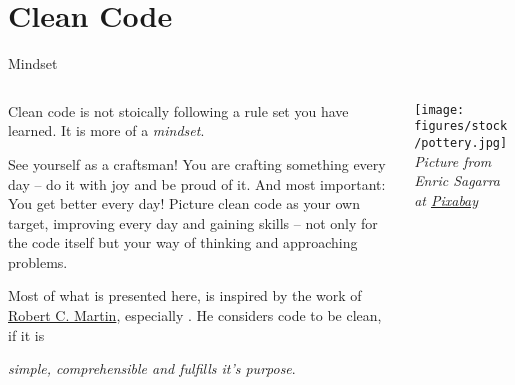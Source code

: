 \documentclass[aspectratio=1610, 9pt]{beamer}
\begin{document}
\section{Clean Code}
\begin{frame}{Mindset}
    \begin{columns}
        \begin{column}{0.5\textwidth}
            \setlength{\parskip}{12pt}%
            Clean code is not stoically following a rule set you have learned.
            It is more of a \textcolor{tugreen}{\emph{mindset}}.

            See yourself as a craftsman!
            You are crafting something every day -- do it with joy and be proud of it.
            And most important: You get better every day!
            Picture clean code as your own target, improving every day and gaining skills -- not only for the code itself but your way of thinking and approaching problems.

            Most of what is presented here, is inspired by the work of \href{https://en.wikipedia.org/wiki/Robert_C._Martin}{Robert C. Martin}, especially \cite{Martin.2009}.
            He considers code to be clean, if it is
            \begin{center}
                \textcolor{tugreen}{\emph{simple, comprehensible and fulfills it's purpose}}.
            \end{center}
        \end{column}
        \begin{column}{0.5\textwidth}
            \texttt{[image: figures/stock/pottery.jpg]}
            {\footnotesize\textit{Picture from Enric Sagarra at \href{https://pixabay.com/images/id-3050615/}{Pixabay}}}
        \end{column}
    \end{columns}
\end{frame}
\end{document}
